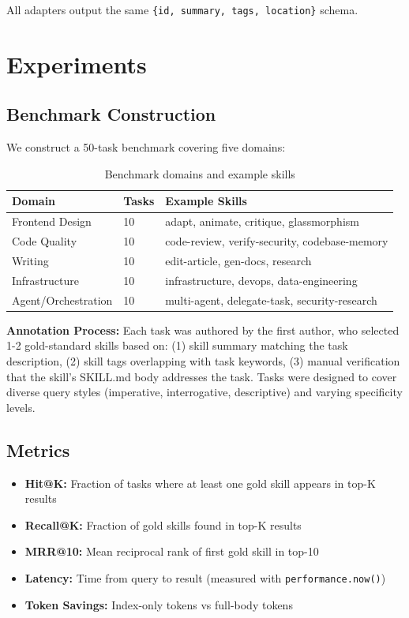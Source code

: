 \documentclass[11pt]{article}
\begin{document}
All adapters output the same \texttt{\{id, summary, tags, location\}} schema.

\section{Experiments}

\subsection{Benchmark Construction}

We construct a 50-task benchmark covering five domains:

\begin{table}[h]
\centering
\begin{tabular}{lll}
\toprule
Domain & Tasks & Example Skills \\
\midrule
Frontend Design & 10 & adapt, animate, critique, glassmorphism \\
Code Quality & 10 & code-review, verify-security, codebase-memory \\
Writing & 10 & edit-article, gen-docs, research \\
Infrastructure & 10 & infrastructure, devops, data-engineering \\
Agent/Orchestration & 10 & multi-agent, delegate-task, security-research \\
\bottomrule
\end{tabular}
\caption{Benchmark domains and example skills}
\end{table}

\textbf{Annotation Process:} Each task was authored by the first author, who selected 1-2 gold-standard skills based on: (1) skill summary matching the task description, (2) skill tags overlapping with task keywords, (3) manual verification that the skill's SKILL.md body addresses the task. Tasks were designed to cover diverse query styles (imperative, interrogative, descriptive) and varying specificity levels.

\subsection{Metrics}

\begin{itemize}
  \item \textbf{Hit@K:} Fraction of tasks where at least one gold skill appears in top-K results
  \item \textbf{Recall@K:} Fraction of gold skills found in top-K results
  \item \textbf{MRR@10:} Mean reciprocal rank of first gold skill in top-10
  \item \textbf{Latency:} Time from query to result (measured with \texttt{performance.now()})
  \item \textbf{Token Savings:} Index-only tokens vs full-body tokens
\end{itemize}
\end{document}
